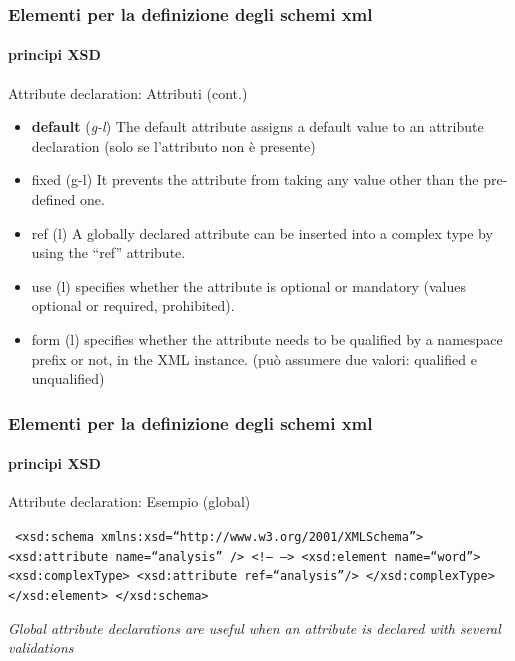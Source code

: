 \begin{frame}
	\frametitle{Elementi per la definizione degli schemi xml}
	\framesubtitle{principi XSD}
	\addtocounter{nframe}{1}

	\begin{block}{Attribute declaration: Attributi (cont.)}
		\begin{itemize}
			\item \textbf{default} (\textit{g-l}) The default attribute assigns a default value to an attribute declaration (solo se l'attributo non è presente)
			\item fixed (g-l) It prevents the attribute from taking any value other than the pre-defined one.
			\item ref (l) A globally declared attribute can be inserted into a complex type by using the ``ref'' attribute.
			\item use (l) specifies whether the attribute is optional or mandatory (values optional or required, prohibited).
			\item form (l) specifies whether the attribute needs to be qualified by a namespace prefix or not, in the XML instance. (può assumere due valori: qualified e unqualified)
		\end{itemize}

	\end{block}


\end{frame}

\begin{frame}
	\frametitle{Elementi per la definizione degli schemi xml}
	\framesubtitle{principi XSD}
	\addtocounter{nframe}{1}

	\begin{block}{Attribute declaration: Esempio (global)}

		\texttt{
			<xsd:schema xmlns:xsd=``http://www.w3.org/2001/XMLSchema''>
			<xsd:attribute name=``analysis'' />
			<!-- -->
			<xsd:element name=``word''>
			<xsd:complexType>
			<xsd:attribute ref=``analysis''/>
			</xsd:complexType>
			</xsd:element>
			</xsd:schema>
		}

	\end{block}

	\textit{Global attribute declarations are useful when an attribute is declared with several validations}


\end{frame}




